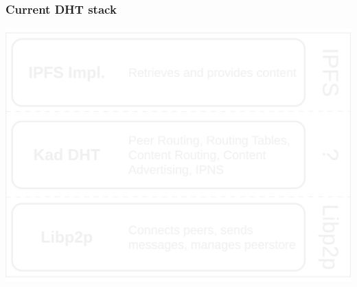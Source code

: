 \documentclass{../pl-slide}
\begin{document}
\begin{frame}
\frametitle{Current DHT stack}
\includegraphics[scale=.2]{resources/old-dht-stack-cat.png}
\end{frame}
\end{document}
